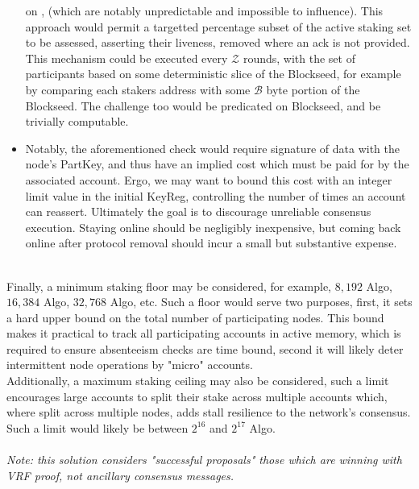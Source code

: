 \documentclass[11pt,a4paper]{article}
\begin{document}
\begin{itemize}
          on , (which are notably unpredictable and impossible to influence). This approach would 
          permit a targetted percentage subset of the active staking set to be assessed, asserting their liveness, 
          removed where an ack is not provided. This mechanism could be executed every \(\mathcal{Z}\) rounds, with the 
          set of participants based on some deterministic slice of the \gls{Blockseed}, for example by comparing each 
          stakers address with some \(\mathcal{B}\) byte portion of the \gls{Blockseed}. The challenge too would be 
          predicated on \gls{Blockseed}, and be trivially computable.
    \item Notably, the aforementioned check would require signature of data with the node's \gls{PartKey}, and thus have
          an implied cost which must be paid for by the associated account. Ergo, we may want to bound this cost with an 
          integer limit value in the initial \gls{KeyReg}, controlling the number of times an account can reassert. 
          Ultimately the goal is to discourage unreliable consensus execution. Staying online should be negligibly 
          inexpensive, but coming back online after protocol removal should incur a small but substantive expense. 

\end{itemize} \mbox{} \\

Finally, a minimum staking floor may be considered, for example, $8,192$ Algo, $16,384$ Algo, $32,768$ Algo, etc. Such a
floor would serve two purposes, first, it sets a hard upper bound on the total number of participating nodes. This bound
makes it practical to track all participating accounts in active memory, which is required to ensure absenteeism checks
are time bound, second it will likely deter intermittent node operations by "micro" accounts. \\ 

Additionally, a maximum staking ceiling may also be considered, such a limit encourages large accounts to split their 
stake across multiple accounts which, where split across multiple nodes, adds stall resilience to the network's 
consensus. Such a limit would likely be between $2^{16}$ and $2^{17}$ Algo. \\ \\

\emph{Note: this solution considers "successful proposals" those which are winning with VRF proof, not ancillary 
      consensus messages.} 
\end{document}
